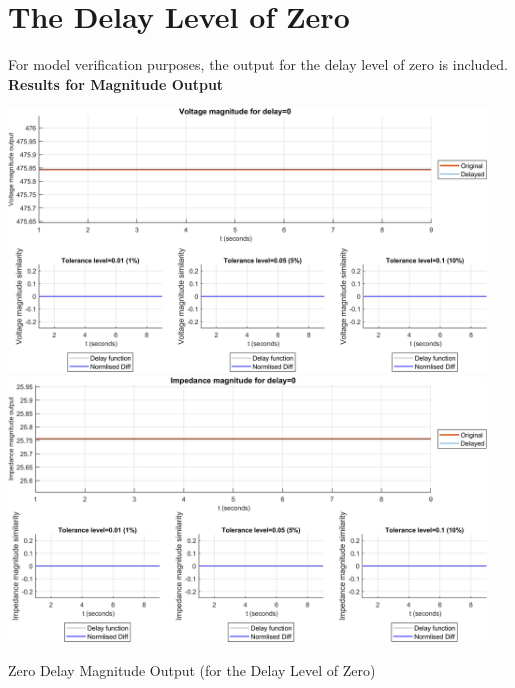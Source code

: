 \section{The Delay Level of Zero}
For model verification purposes, the output for the delay level of zero is included.
\newpage  \textbf{Results for Magnitude Output}

\begin{small}
\end{small}


\begin{floatingfigure}[p]{\textwidth}
    \includegraphics[width=0.95\textwidth]{PMUsim-figures/DelayOf_0/Zero_vMagnitude.png}    
    \label{fig:PMUsim_Zero_vMagnitude}
    \includegraphics[width=0.95\textwidth]{PMUsim-figures/DelayOf_0/Zero_iMagnitude.png}    
    \caption{Zero Delay Magnitude Output (for the Delay Level of Zero)}
    \label{fig:PMUsim_Zero_Magnitude}
\end{floatingfigure}

